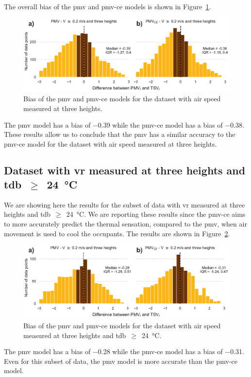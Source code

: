 The overall bias of the \ac{pmv} and \ac{pmv-ce} models is shown in Figure~\ref{fig:hist_discrepancies_three_heights}.
\begin{figure}[htb!]
    \centering
    \includegraphics[width=\textwidth]{figures/hist_discrepancies_three_heights}
    \caption{Bias of the \ac{pmv} and \ac{pmv-ce} models for the dataset with air speed measured at three heights.}
    \label{fig:hist_discrepancies_three_heights}
\end{figure}
The \ac{pmv} model has a bias of \num{-.39} while the \ac{pmv-ce} model has a bias of \num{-.38}.
These results allow us to conclude that the \ac{pmv} has a similar accuracy to the \ac{pmv-ce} model for the dataset with air speed measured at three heights.

\subsection{Dataset with \ac{vr} measured at three heights and \ac{tdb}~$\geq$~\qty{24}{\celsius}}\label{subsec:dataset-with-v-measured-at-three-heights-and-tdb-geq-24-celsius}
We are showing here the results for the subset of data with \ac{vr} measured at three heights and \ac{tdb}~$\geq$~\qty{24}{\celsius}.
We are reporting these results since the \ac{pmv-ce} aims to more accurately predict the thermal sensation, compared to the \ac{pmv}, when air movement is used to cool the occupants.
The results are shown in Figure~\ref{fig:hist_discrepancies_three_heights_limit_t}.
\begin{figure}[htb!]
    \centering
    \includegraphics[width=\textwidth]{figures/hist_discrepancies_three_heights_limit_t}
    \caption{Bias of the \ac{pmv} and \ac{pmv-ce} models for the dataset with air speed measured at three heights and \ac{tdb}~$\geq$~\qty{24}{\celsius}.}
    \label{fig:hist_discrepancies_three_heights_limit_t}
\end{figure}

The \ac{pmv} model has a bias of \num{-.28} while the \ac{pmv-ce} model has a bias of \num{-.31}.
Even for this subset of data, the \ac{pmv} model is more accurate than the \ac{pmv-ce} model.